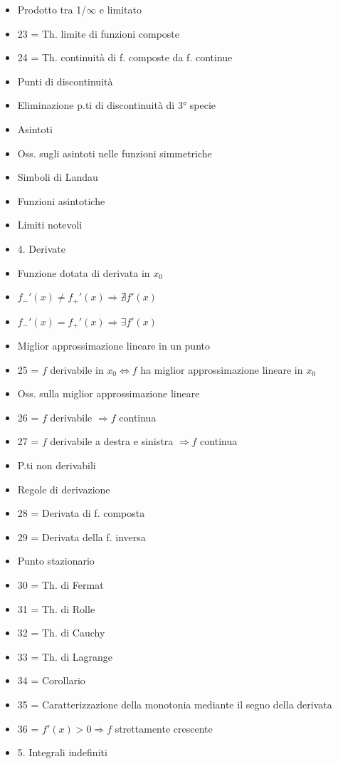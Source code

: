 \begin{itemize}
\item Prodotto tra 1/$\infty$ e limitato
\item 23 = Th. limite di funzioni composte
\item 24 = Th. continuità di f. composte da f. continue
\item Punti di discontinuità
\item Eliminazione p.ti di discontinuità di 3° specie
\item Asintoti
\item Oss. sugli asintoti nelle funzioni simmetriche
\item Simboli di Landau
\item Funzioni asintotiche
\item Limiti notevoli
\item 4. Derivate
\item Funzione dotata di derivata in $x_0$
\item $f_-'(x)\ne f_+'(x)\Rightarrow\nexists f'(x)$
\item $f_-'(x)=f_+'(x)\Rightarrow\exists f'(x)$
\item Miglior approssimazione lineare in un punto
\item 25 = $f$ derivabile in $x_0\iff f$ ha miglior approssimazione lineare in $x_0$
\item Oss. sulla miglior approssimazione lineare
\item 26 = $f$ derivabile $\Rightarrow f$ continua
\item 27 = $f$ derivabile a destra e sinistra $\Rightarrow f$ continua
\item P.ti non derivabili
\item Regole di derivazione
\item 28 = Derivata di f. composta
\item 29 = Derivata della f. inversa
\item Punto stazionario
\item 30 = Th. di Fermat
\item 31 = Th. di Rolle
\item 32 = Th. di Cauchy
\item 33 = Th. di Lagrange
\item 34 = Corollario
\item 35 = Caratterizzazione della monotonia mediante il segno della derivata
\item 36 = $f'(x)>0\Rightarrow f$ strettamente crescente
\item 5. Integrali indefiniti

\end{itemize}
